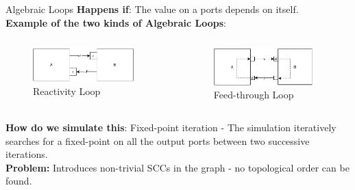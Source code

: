 \documentclass{beamer}
\begin{document}
\begin{frame}{Algebraic Loops}
    \textbf{Happens if}: The value on a ports depends on itself.\\
    \textbf{Example of the two kinds of Algebraic Loops}: 
    \begin{columns}[T] %
        \begin{column}{.48\textwidth}
            \begin{figure}    
                \includegraphics[width=0.9\textwidth]{images/reactive_loop_scenario.pdf}
                \caption{Reactivity Loop}
            \end{figure}
    \end{column}%
    \hfill%
    \begin{column}{.48\textwidth}
        \begin{figure}    
            \includegraphics[width=0.9\textwidth]{images/feedthroughloop.pdf}
            \caption{Feed-through Loop}
        \end{figure}
    \end{column}%
    \end{columns}
    \textbf{How do we simulate this}: Fixed-point iteration - The simulation iteratively searches for a fixed-point on all the output ports between two successive iterations.\\
    \textbf{Problem:} Introduces non-trivial SCCs in the graph - no topological order can be found.
\end{frame}
\end{document}
